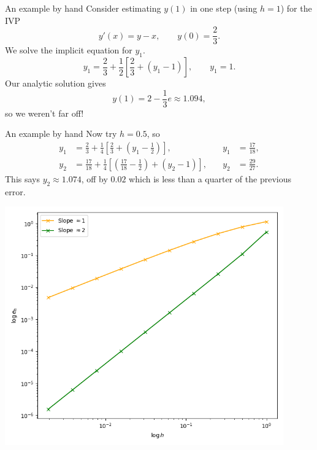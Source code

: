 \documentclass{beamer}
\begin{document}
    \begin{frame}{An example by hand}
        Consider estimating $y(1)$ in one step (using $h = 1$) for the IVP \[
            y'(x) = y - x, \qquad y(0) = \frac{2}{3}.
        \] We solve the implicit equation for $y_1$. \[
            y_1 = \frac{2}{3} + \frac{1}{2}\left[\frac{2}{3} + (y_1 - 1)\right],
            \qquad y_1 = 1.
        \] Our analytic solution gives \[
            y(1) = 2 - \frac{1}{3}e \approx 1.094,
        \] so we weren't far off!
    \end{frame}

    \begin{frame}{An example by hand}
        Now try $h = 0.5$, so \begin{align*}
            y_1 &= \frac{2}{3} + \frac{1}{4}\left[\frac{2}{3} + \left(y_1 -
            \frac{1}{2}\right)\right],
            \qquad &y_1 &= \frac{17}{18}, \\
            y_2 &= \frac{17}{18} + \frac{1}{4}\left[\left(\frac{17}{18} -
            \frac{1}{2}\right) + \left(y_2 - 1\right)\right],
            \quad &y_2 &= \frac{29}{27}.
        \end{align*}
        This says $y_2 \approx 1.074$, off by $0.02$ which is less than a quarter of
        the previous error.
    \end{frame}
    
    \begin{frame}[plain]
        \begin{center}
            \includegraphics[width=0.9\textwidth]{./img/errors.png}
        \end{center}
    \end{frame}
\end{document}
